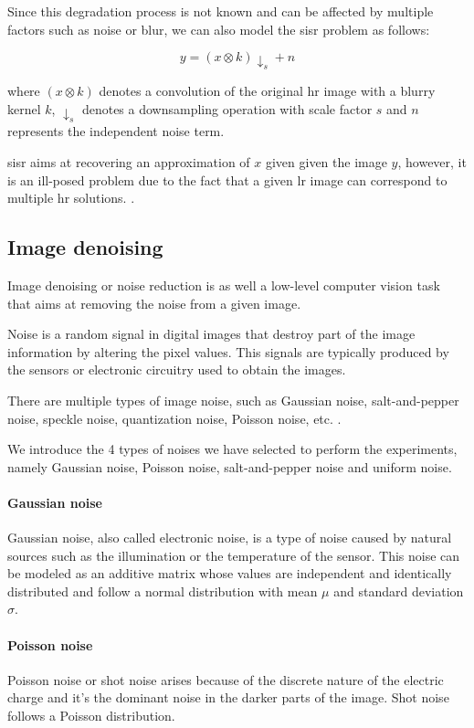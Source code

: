 Since this degradation process is not known and can be affected by multiple factors such as noise or blur, we can also model the \gls{sisr} problem as follows:

$$y = (x\otimes k)\downarrow_s + n$$

where $(x\otimes k)$ denotes a convolution of the original \gls{hr} image with a blurry kernel $k$, $\downarrow_s$ denotes a downsampling operation with scale factor $s$ and $n$ represents the independent noise term.

\gls{sisr} aims at recovering an approximation of $x$ given given the image $y$, however, it is an ill-posed problem due to the fact that a given \gls{lr} image can correspond to multiple \gls{hr} solutions. \cite{DBLP:DEEPSISR}.

\subsection{Image denoising}
Image denoising or noise reduction is as well a low-level computer vision task that aims at removing the noise from a given image. 

Noise is a random signal in digital images that destroy part of the image information by altering the pixel values. This signals are typically produced by the sensors or electronic circuitry used to obtain the images.

There are multiple types of image noise, such as Gaussian noise, salt-and-pepper noise, speckle noise, quantization noise, Poisson noise, etc. \cite{NOISE}.

We introduce the 4 types of noises we have selected to perform the experiments, namely Gaussian noise, Poisson noise, salt-and-pepper noise and uniform noise. \

\paragraph{Gaussian noise}
Gaussian noise, also called electronic noise, is a type of noise caused by natural sources such as the illumination or the temperature of the sensor. This noise can be modeled as an additive matrix whose values are independent and identically distributed and follow a normal distribution with mean $\mu$ and standard deviation $\sigma$.

\paragraph{Poisson noise}
Poisson noise or shot noise arises because of the discrete nature of the electric charge and it's the dominant noise in the darker parts of the image. Shot noise follows a Poisson distribution.

